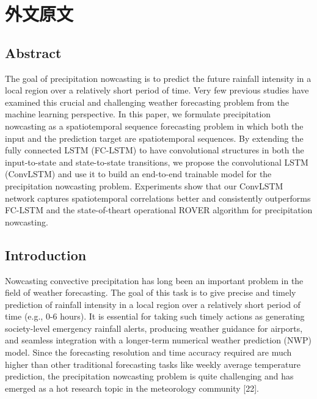 \cleardoublepage
\chapter{外文原文}


\section*{Abstract}

\par The goal of precipitation nowcasting is to predict the future rainfall intensity in a local region over a relatively short period of time. Very few previous studies have examined this crucial and challenging weather forecasting problem from the machine learning perspective. In this paper, we formulate precipitation nowcasting as a spatiotemporal sequence forecasting problem in which both the input and the prediction target are spatiotemporal sequences. By extending the fully connected LSTM (FC-LSTM) to have convolutional structures in both the input-to-state and state-to-state transitions, we propose the convolutional LSTM (ConvLSTM) and use it to build an end-to-end trainable model for the precipitation nowcasting problem. Experiments show that our ConvLSTM network captures spatiotemporal correlations better and consistently outperforms FC-LSTM and the state-of-theart operational ROVER algorithm for precipitation nowcasting.

\section{Introduction}

\par Nowcasting convective precipitation has long been an important problem in the field of weather forecasting. The goal of this task is to give precise and timely prediction of rainfall intensity in a local region over a relatively short period of time (e.g., 0-6 hours). It is essential for taking such timely actions as generating society-level emergency rainfall alerts, producing weather guidance for airports, and seamless integration with a longer-term numerical weather prediction (NWP) model. Since the forecasting resolution and time accuracy required are much higher than other traditional forecasting tasks like weekly average temperature prediction, the precipitation nowcasting problem is quite challenging and has emerged as a hot research topic in the meteorology community [22].

